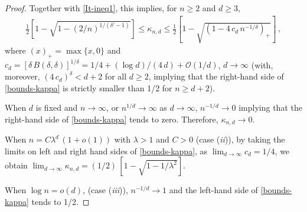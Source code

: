 \documentclass{article}
\def\ml{\lambda}
\newcommand{\be}{\begin{eqnarray}}
\newcommand{\ee}{\end{eqnarray}}
\def\SO{{\mathcal O}}
\begin{document}
\begin{proof}
Together with \eqref{It-ineq1}, this implies, for $n\geq 2$ and $d\geq 3$,
\be\label{bounds-kappa}
\frac12 \left[1-\sqrt{1- (2/n)^{1/(\delta'-1)}}\right]  \leq \kappa_{n,d} \leq \frac12 \left[1-\sqrt{(1-4\,c_d\,n^{-1/\delta})_+}\right] \,,
\ee
where $(x)_+=\max\{x,0\}$ and $c_d=[\delta\,B(\delta,\delta)]^{1/\delta} = 1/4+ (\log d)/(4\,d)+\SO(1/d)$, $d\to\infty$ (with, moreover, $(4\,c_d)^\delta<d+2$ for all $d \geq 2$, implying that the right-hand side of \eqref{bounds-kappa} is strictly smaller than  1/2 for $n\geq d+2$).

When $d$ is fixed and $n\to\infty$, or $n^{1/d}\to\infty$ as $d\to\infty$, $n^{-1/d}\to 0$ implying that the right-hand side of \eqref{bounds-kappa} tends to zero. Therefore, $\kappa_{n,d}\to 0$.

When $n=C\ml^d\,(1+o(1))$ with $\ml>1$ and $C>0$ (case (\textit{ii})), by taking the limits on left and right hand sides of \eqref{bounds-kappa}, as $\lim_{d\to\infty} c_d=1/4$, we obtain $\lim_{d\to\infty} \kappa_{n,d} = (1/2)\,\left[1-\sqrt{1-1/\ml^2}\right]$.

When $\log n = o(d)$, (case (\textit{iii})), $n^{-1/d}\to 1$ and the left-hand side of \eqref{bounds-kappa} tends to 1/2.
\end{proof}
\end{document}
